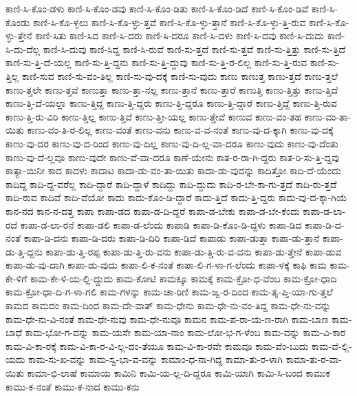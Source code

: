 {ಕಾಣಿ-ಸಿ-ಕೊಂ-ಡಳು
ಕಾಣಿ-ಸಿ-ಕೊಂ-ಡವು
ಕಾಣಿ-ಸಿ-ಕೊಂ-ಡಿತು
ಕಾಣಿ-ಸಿ-ಕೊಂ-ಡಿದೆ
ಕಾಣಿ-ಸಿ-ಕೊಂ-ಡಿವೆ
ಕಾಣಿ-ಸಿ-ಕೊಂಡು
ಕಾಣಿ-ಸಿ-ಕೊ-ಳ್ಳಲು
ಕಾಣಿ-ಸಿ-ಕೊ-ಳ್ಳು-ತ್ತವೆ
ಕಾಣಿ-ಸಿ-ಕೊ-ಳ್ಳು-ತ್ತಾನೆ
ಕಾಣಿ-ಸಿ-ಕೊ-ಳ್ಳು-ತ್ತಿ-ರುವ
ಕಾಣಿ-ಸಿ-ಕೊ-ಳ್ಳು-ತ್ತೇನೆ
ಕಾಣಿ-ಸಿತು
ಕಾಣಿ-ಸಿದ
ಕಾಣಿ-ಸಿ-ದರು
ಕಾಣಿ-ಸಿ-ದರೂ
ಕಾಣಿ-ಸಿ-ದಳು
ಕಾಣಿ-ಸಿ-ದವು
ಕಾಣಿ-ಸಿ-ದುದು
ಕಾಣಿ-ಸಿ-ದು-ದೆಲ್ಲ
ಕಾಣಿ-ಸಿ-ದುವು
ಕಾಣಿ-ಸಿದ್ದ
ಕಾಣಿ-ಸಿ-ರುವೆ
ಕಾಣಿ-ಸು-ತ್ತದೆ
ಕಾಣಿ-ಸು-ತ್ತವೆ
ಕಾಣಿ-ಸು-ತ್ತಿತ್ತು
ಕಾಣಿ-ಸು-ತ್ತಿದೆ
ಕಾಣಿ-ಸು-ತ್ತಿ-ದೆ-ಯಲ್ಲ
ಕಾಣಿ-ಸು-ತ್ತಿ-ದ್ದನು
ಕಾಣಿ-ಸು-ತ್ತಿ-ದ್ದುವು
ಕಾಣಿ-ಸು-ತ್ತಿ-ರ-ಲಿಲ್ಲ
ಕಾಣಿ-ಸು-ತ್ತಿ-ರುವ
ಕಾಣಿ-ಸು-ತ್ತಿಲ್ಲ
ಕಾಣಿ-ಸುವ
ಕಾಣಿ-ಸು-ವಂ-ತಿಲ್ಲ
ಕಾಣಿ-ಸು-ವು-ದಕ್ಕೆ
ಕಾಣಿ-ಸು-ವುದು
ಕಾಣು
ಕಾಣುತ್ತ
ಕಾಣು-ತ್ತದೆ
ಕಾಣು-ತ್ತಲೆ
ಕಾಣು-ತ್ತಲೇ
ಕಾಣು-ತ್ತವೆ
ಕಾಣುತ್ತಾ
ಕಾಣು-ತ್ತಾ-ನಲ್ಲ
ಕಾಣು-ತ್ತಾನೆ
ಕಾಣು-ತ್ತಾರೆ
ಕಾಣುತ್ತಿ
ಕಾಣು-ತ್ತಿತ್ತು
ಕಾಣು-ತ್ತಿದೆ
ಕಾಣು-ತ್ತಿ-ದೆ-ಯಲ್ಲಾ
ಕಾಣು-ತ್ತಿದ್ದ
ಕಾಣು-ತ್ತಿ-ದ್ದರು
ಕಾಣು-ತ್ತಿ-ದ್ದರೂ
ಕಾಣು-ತ್ತಿ-ದ್ದಾರೆ
ಕಾಣು-ತ್ತಿದ್ದೆ
ಕಾಣು-ತ್ತಿ-ರುವ
ಕಾಣು-ತ್ತಿ-ರು-ವಿರಿ
ಕಾಣು-ತ್ತಿಲ್ಲ
ಕಾಣು-ತ್ತಿವೆ
ಕಾಣು-ತ್ತೀ-ಯಲ್ಲ
ಕಾಣು-ತ್ತೇವೆ
ಕಾಣುವ
ಕಾಣು-ವಂ-ತಹ
ಕಾಣು-ವಂ-ತಾ-ಯಿತು
ಕಾಣು-ವಂ-ತಿ-ರ-ಲಿಲ್ಲ
ಕಾಣು-ವಂತೆ
ಕಾಣು-ವನು
ಕಾಣು-ವ-ವ-ನಂತೆ
ಕಾಣು-ವು-ದ-ಕ್ಕಾಗಿ
ಕಾಣು-ವು-ದಕ್ಕೆ
ಕಾಣು-ವು-ದರ
ಕಾಣು-ವು-ದ-ರಿಂದ
ಕಾಣು-ವು-ದಿಲ್ಲ
ಕಾಣು-ವು-ದಿ-ಲ್ಲ-ವಾ-ದರೂ
ಕಾಣು-ವುದು
ಕಾಣು-ವು-ದೆಂತು
ಕಾಣು-ವು-ದೆ-ಲ್ಲವೂ
ಕಾಣು-ವುದೇ
ಕಾಣು-ವೆ-ವಾ-ದರೂ
ಕಾಣೆ-ಯೇನು
ಕಾತ-ರ-ರಾ-ಗಿ-ದ್ದರು
ಕಾತ-ರಿ-ಸು-ತ್ತಿ-ದ್ದವು
ಕಾತ್ಯಾ-ಯಿನೀ
ಕಾದ
ಕಾದಳು
ಕಾದಾಟ
ಕಾದಾ-ಡು-ವಂ-ತಾ-ಯಿತು
ಕಾದಾ-ಡು-ವುದನ್ನು
ಕಾದಿತ್ತೋ
ಕಾದಿ-ದೆ-ಯೆಂದು
ಕಾದಿದ್ದ
ಕಾದಿ-ದ್ದ-ವರೆಲ್ಲ
ಕಾದಿ-ದ್ದಾರೆ
ಕಾದಿ-ದ್ದಾಳೆ
ಕಾದಿದ್ದು
ಕಾದಿ-ದ್ದುದು
ಕಾದಿ-ರ-ಬೇ-ಕಾ-ಗು-ತ್ತದೆ
ಕಾದಿ-ರು-ತ್ತದೆ
ಕಾದಿ-ರುವ
ಕಾದಿವೆ
ಕಾದಿ-ವೆಯೋ
ಕಾದು
ಕಾದು-ಕೊಂ-ಡಿ-ದ್ದಾರೆ
ಕಾದು-ತ್ತಿದೆ
ಕಾದು-ತ್ತಿ-ದ್ದರು
ಕಾದು-ವು-ದ-ಕ್ಕಾ-ಗಿಯೆ
ಕಾನ-ನದ
ಕಾನ-ನ-ದತ್ತ
ಕಾಪಾ
ಕಾಪಾ-ಡದ
ಕಾಪಾ-ಡ-ದಿ-ದ್ದರೆ
ಕಾಪಾ-ಡ-ಬೇಕು
ಕಾಪಾ-ಡ-ಬೇ-ಕೆಂದು
ಕಾಪಾ-ಡ-ಲಾ-ರದೆ
ಕಾಪಾ-ಡ-ಲಾ-ರನೆ
ಕಾಪಾ-ಡಲಿ
ಕಾಪಾ-ಡ-ಲೆಂದು
ಕಾಪಾಡಿ
ಕಾಪಾ-ಡಿ-ಕೊಂ-ಡಿ-ದ್ದಳು
ಕಾಪಾ-ಡಿದ
ಕಾಪಾ-ಡಿ-ದ-ನಂತೆ
ಕಾಪಾ-ಡಿ-ದನು
ಕಾಪಾ-ಡಿ-ದರು
ಕಾಪಾ-ಡಿ-ದಿರಿ
ಕಾಪಾ-ಡಿದೆ
ಕಾಪಾಡು
ಕಾಪಾ-ಡುತ್ತಾ
ಕಾಪಾ-ಡು-ತ್ತಾನೆ
ಕಾಪಾ-ಡು-ತ್ತಿ-ದ್ದನು
ಕಾಪಾ-ಡು-ತ್ತಿ-ರಪ್ಪ
ಕಾಪಾ-ಡು-ತ್ತಿ-ರು-ವನು
ಕಾಪಾ-ಡು-ತ್ತಿ-ರು-ವ-ವನು
ಕಾಪಾ-ಡು-ತ್ತೇನೆ
ಕಾಪಾ-ಡುವ
ಕಾಪಾ-ಡು-ವು-ದಾಗಿ
ಕಾಪಾ-ಡು-ವುದು
ಕಾಪಾ-ಲಿ-ಕ-ನಂತೆ
ಕಾಪಾ-ಲಿ-ಗ-ಳಾ-ಗ-ಲೆಂದು
ಕಾಪಾ-ಳಕ್ಕೆ
ಕಾಫಿ
ಕಾಮ
ಕಾಮ-ಕೇ-ಳಿಗೆ
ಕಾಮ-ಕೇ-ಳಿ-ಯ-ಲ್ಲಿ-ದ್ದುದು
ಕಾಮ-ಕೋಟಿ
ಕಾಮಕ್ಕೂ
ಕಾಮಕ್ಕೆ
ಕಾಮ-ಕ್ರೋ-ಧ-ವೆಂಬ
ಕಾಮ-ಕ್ರೋ-ಧಾದಿ
ಕಾಮ-ಕ್ರೋ-ಧಾ-ದಿ-ಗ-ಳಾ-ಗಲಿ
ಕಾಮ-ಗಳನ್ನು
ಕಾಮ-ಚಾ-ರಿಣಿ
ಕಾಮ-ಜ್ವ-ರ-ದಿಂದ
ಕಾಮ-ತೃ-ಪ್ತಿ-ಯಾ-ಗು-ತ್ತಲೆ
ಕಾಮದ
ಕಾಮದಂ
ಕಾಮ-ದಿಂದ
ಕಾಮ-ದೇ-ವಾತ್
ಕಾಮ-ಧೇನು
ಕಾಮ-ಧೇ-ನು-ವಂ-ತಿದ್ದ
ಕಾಮ-ಧೇ-ನು-ವನ್ನು
ಕಾಮ-ಧೇ-ನು-ವಿ-ನಂತೆ
ಕಾಮ-ಧೇ-ನುವು
ಕಾಮ-ಧೇ-ನುವೂ
ಕಾಮನ
ಕಾಮ-ಪ-ರಾ-ಯ-ಣ-ರಾಗಿ
ಕಾಮ-ಬಾಣ
ಕಾಮ-ಬಾಧೆ
ಕಾಮ-ಭೋ-ಗ-ವನ್ನು
ಕಾಮ-ಯಸೇ
ಕಾಮ-ಯಾ-ನಾಂ
ಕಾಮ-ಲೋ-ಭ-ಗ-ಳೆಂಬ
ಕಾಮ-ವನ್ನು
ಕಾಮ-ವಿ-ಕಾರ
ಕಾಮ-ವಿ-ಕಾ-ರಕ್ಕೆ
ಕಾಮ-ವಿ-ಕಾ-ರ-ವಿ-ಲ್ಲ-ದಂ-ತೆಯೂ
ಕಾಮ-ವಿ-ಕಾ-ರವೇ
ಕಾಮವೂ
ಕಾಮ-ವೆಂ-ಬುದು
ಕಾಮ-ವೆ-ಲ್ಲಿ-ಯದು
ಕಾಮ-ಸು-ಖ-ವನ್ನು
ಕಾಮ-ಸ್ವ-ಭಾ-ವ-ವನ್ನು
ಕಾಮಾಂ-ಧ-ನಾ-ಗಿದ್ದ
ಕಾಮಾ-ತು-ರ-ಳಾಗಿ
ಕಾಮಾ-ತು-ರ-ವಾ-ಯಿತು
ಕಾಮಾ-ಭಿ-ಲಾಷೆ
ಕಾಮಾಯ
ಕಾಮಿನಿ
ಕಾಮಿ-ಯ-ಲ್ಲ-ದಿ-ದ್ದರೂ
ಕಾಮಿ-ಯಾಗಿ
ಕಾಮಿ-ಸಿ-ಬಂದ
ಕಾಮುಕ
ಕಾಮು-ಕ-ನಂತೆ
ಕಾಮು-ಕ-ನಾದ
ಕಾಮು-ಕನು
}
